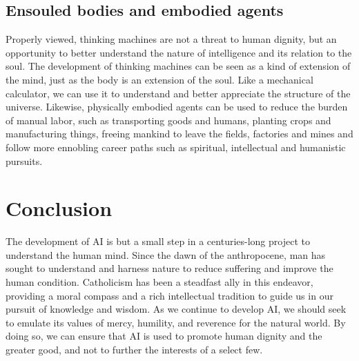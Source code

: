 \documentclass[sigplan,nonacm]{acmart}\settopmatter{printfolios=false,printccs=false,printacmref=false}
\begin{document}
  \subsection{Ensouled bodies and embodied agents}

  Properly viewed, thinking machines are not a threat to human dignity, but an opportunity to better understand the nature of intelligence and its relation to the soul. The development of thinking machines can be seen as a kind of extension of the mind, just as the body is an extension of the soul. Like a mechanical calculator, we can use it to understand and better appreciate the structure of the universe. Likewise, physically embodied agents can be used to reduce the burden of manual labor, such as transporting goods and humans, planting crops and manufacturing things, freeing mankind to leave the fields, factories and mines and follow more ennobling career paths such as spiritual, intellectual and humanistic pursuits.

  \section{Conclusion}

  The development of AI is but a small step in a centuries-long project to understand the human mind. Since the dawn of the anthropocene, man has sought to understand and harness nature to reduce suffering and improve the human condition. Catholicism has been a steadfast ally in this endeavor, providing a moral compass and a rich intellectual tradition to guide us in our pursuit of knowledge and wisdom. As we continue to develop AI, we should seek to emulate its values of mercy, humility, and reverence for the natural world. By doing so, we can ensure that AI is used to promote human dignity and the greater good, and not to further the interests of a select few.

  
\clearpage
\end{document}

